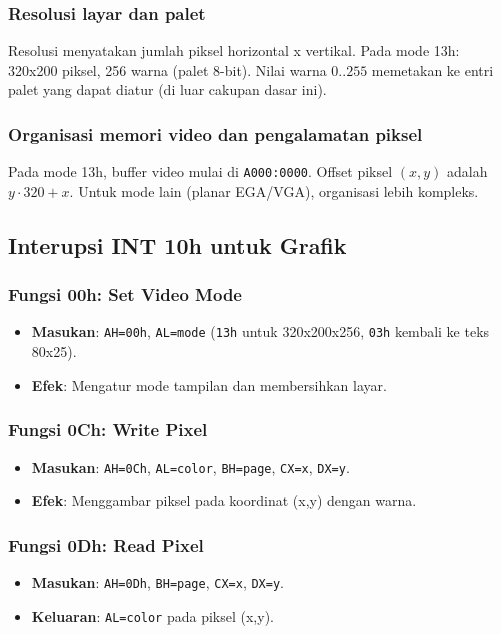 \documentclass[../main.tex]{subfiles}
\begin{document}
        \subsubsection{Resolusi layar dan palet}
            Resolusi menyatakan jumlah piksel horizontal x vertikal. Pada mode 13h: 320x200 piksel, 256 warna (palet 8-bit). Nilai warna \(0..255\) memetakan ke entri palet yang dapat diatur (di luar cakupan dasar ini).

        \subsubsection{Organisasi memori video dan pengalamatan piksel}
            Pada mode 13h, buffer video mulai di \texttt{A000:0000}. Offset piksel \((x,y)\) adalah \(y\cdot 320 + x\). Untuk mode lain (planar EGA/VGA), organisasi lebih kompleks.

        \subsection{Interupsi INT 10h untuk Grafik}
            \subsubsection{Fungsi 00h: Set Video Mode}
                \begin{itemize}
                    \item \textbf{Masukan}: \texttt{AH=00h}, \texttt{AL=mode} (\texttt{13h} untuk 320x200x256, \texttt{03h} kembali ke teks 80x25).
                    \item \textbf{Efek}: Mengatur mode tampilan dan membersihkan layar.
                \end{itemize}

            \subsubsection{Fungsi 0Ch: Write Pixel}
                \begin{itemize}
                    \item \textbf{Masukan}: \texttt{AH=0Ch}, \texttt{AL=color}, \texttt{BH=page}, \texttt{CX=x}, \texttt{DX=y}.
                    \item \textbf{Efek}: Menggambar piksel pada koordinat (x,y) dengan warna.
                \end{itemize}

            \subsubsection{Fungsi 0Dh: Read Pixel}
                \begin{itemize}
                    \item \textbf{Masukan}: \texttt{AH=0Dh}, \texttt{BH=page}, \texttt{CX=x}, \texttt{DX=y}.
                    \item \textbf{Keluaran}: \texttt{AL=color} pada piksel (x,y).
                \end{itemize}
\end{document}
